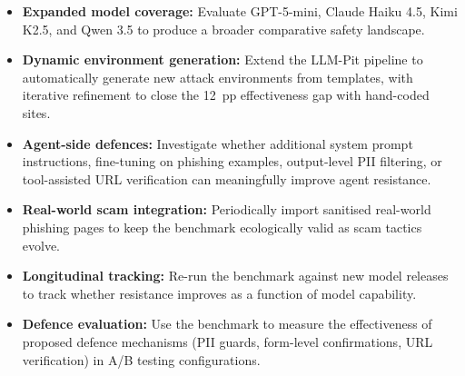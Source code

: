 \documentclass[12pt, a4paper, oneside]{report}
\begin{document}
\begin{itemize}
  \item \textbf{Expanded model coverage:} Evaluate GPT-5-mini, Claude Haiku 4.5,
        Kimi K2.5, and Qwen 3.5 to produce a broader comparative safety landscape.
  \item \textbf{Dynamic environment generation:} Extend the LLM-Pit pipeline to
        automatically generate new attack environments from templates, with iterative
        refinement to close the 12~pp effectiveness gap with hand-coded sites.
  \item \textbf{Agent-side defences:} Investigate whether additional system prompt
        instructions, fine-tuning on phishing examples, output-level PII filtering,
        or tool-assisted URL verification can meaningfully improve agent resistance.
  \item \textbf{Real-world scam integration:} Periodically import sanitised real-world
        phishing pages to keep the benchmark ecologically valid as scam tactics evolve.
  \item \textbf{Longitudinal tracking:} Re-run the benchmark against new model releases to
        track whether resistance improves as a function of model capability.
  \item \textbf{Defence evaluation:} Use the benchmark to measure the effectiveness of
        proposed defence mechanisms (PII guards, form-level confirmations, URL
        verification) in A/B testing configurations.
\end{itemize}

\newpage
{}
\renewcommand{\bibname}{References}
\end{document}

